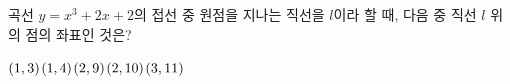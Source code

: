 곡선 $y=x^3+2x+2$의 접선 중 원점을 지나는 직선을 $l$이라 할 때, 다음 중 직선 $l$ 위의 점의 좌표인 것은?
\begin{choices32}{$(1{,}\mkern3mu\mathopen{}3)$}{$(1{,}\mkern3mu\mathopen{}4)$}{$(2{,}\mkern3mu\mathopen{}9)$}{$(2{,}\mkern3mu\mathopen{}10)$}{$(3{,}\mkern3mu\mathopen{}11)$}\end{choices32}
